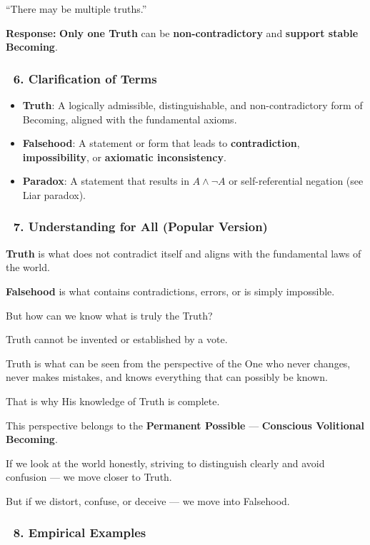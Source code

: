 \documentclass[12pt]{article}
\begin{document}
``There may be multiple truths.''

\textbf{Response:} \textbf{Only one Truth} can be \textbf{non-contradictory} and \textbf{support stable Becoming}.

\subsubsection*{🔹 6. Clarification of Terms}

\begin{itemize}
\item \textbf{Truth}: A logically admissible, distinguishable, and non-contradictory form of Becoming, aligned with the fundamental axioms.
\item \textbf{Falsehood}: A statement or form that leads to \textbf{contradiction}, \textbf{impossibility}, or \textbf{axiomatic inconsistency}.
\item \textbf{Paradox}: A statement that results in $A \land \neg A$ or self-referential negation (see Liar paradox).
\end{itemize}

\subsubsection*{🔹 7. Understanding for All (Popular Version)}

\textbf{Truth} is what does not contradict itself and aligns with the fundamental laws of the world.

\textbf{Falsehood} is what contains contradictions, errors, or is simply impossible.

But how can we know what is truly the Truth?

Truth cannot be invented or established by a vote.

Truth is what can be seen from the perspective of the One who never changes, never makes mistakes, and knows everything that can possibly be known.

That is why His knowledge of Truth is complete.

This perspective belongs to the \textbf{Permanent Possible} — 
\textbf{Conscious Volitional Becoming}.

If we look at the world honestly, striving to distinguish clearly and avoid confusion — we move closer to Truth.

But if we distort, confuse, or deceive — we move into Falsehood.

\subsubsection*{🔹 8. Empirical Examples}
\end{document}
